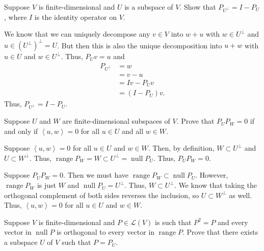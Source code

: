 \documentclass[12 pt, letterpaper]{hmcpset}
\begin{document}
\pagebreak

\begin{problem}[5]
	Suppose $V$ is finite-dimensional and $U$ is a subspace of $V$. Show that $P_{U^{\perp}} = I - P_{U}$, where $I$ is the identity operator on $V$.
\end{problem}

\begin{solution}
	We know that we can uniquely decompose any $v \in V$ into $w + u$ with $w \in U^{\perp}$ and $u \in (U^{\perp})^{\perp} = U$. But then this is also the unique decomposition into $u + w$ with $u \in U$ and $w \in U^{\perp}$. Thus, $P_{U} v = u$ and
	\[
		\begin{split}
			P_{U^{\perp}} & = w \\
				      & = v - u \\
				      & = I v - P_{U} v \\
				      & = (I - P_{U}) v.
		\end{split}
	\]
	Thus, $P_{U^{\perp}} = I - P_{U}$.
\end{solution}

\pagebreak

\begin{problem}[6]
	Suppose $U$ and $W$ are finite-dimensional subspaces of $V$. Prove that $P_{U} P_{W} = 0$ if and only if $\left < u, w \right > = 0$ for all $u \in U$ and all $w \in W$.
\end{problem}

\begin{solution}
	Suppose $\left < u, w \right > = 0$ for all $u \in U$ and $w \in W$. Then, by definition, $W \subset U^{\perp}$ and $U \subset W^{\perp}$. Thus, $\operatorname{range} P_{W} = W \subset U^{\perp} = \operatorname{null} P_{U}$. Thus, $P_{U} P_{W} = 0$.

	Suppose $P_{U} P_{W} = 0$. Then we must have $\operatorname{range} P_{W} \subset \operatorname{null} P_{U}$. However, $\operatorname{range} P_{W}$ is just $W$ and $\operatorname{null} P_{U} = U^{\perp}$. Thus, $W \subset U^{\perp}$. We know that taking the orthogonal complement of both sides reverses the inclusion, so $U \subset W^{\perp}$ as well. Thus, $\left < u, w \right > = 0$ for all $u \in U$ and $w \in W$.
\end{solution}

\pagebreak

\begin{problem}[7]
	Suppose $V$ is finite-dimensional and $P \in \mathcal{L}(V)$ is such that $P^{2} = P$ and every vector in $\operatorname{null} P$ is orthogonal to every vector in $\operatorname{range} P$. Prove that there exists a subspace $U$ of $V$ such that $P = P_{U}$.
\end{problem}
\end{document}
